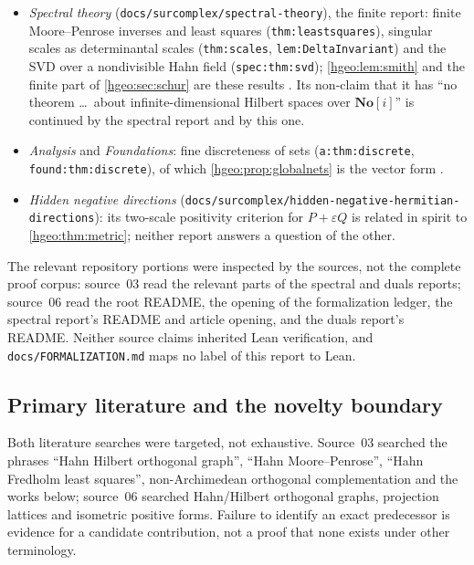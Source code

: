 \documentclass[11pt,letterpaper]{article}
\numberwithin{equation}{section}
\theoremstyle{definition}
\theoremstyle{remark}
\newcommand{\No}{\mathbf{No}}
\newcommand{\replabel}[1]{\nolinkurl{#1}}
\newcommand{\fn}[1]{\nolinkurl{#1}}
\begin{document}
\begin{itemize}[leftmargin=*]
orthogonal complement (\replabel{duals:thm:hyperplane}) and the exact
distance cut (\replabel{duals:thm:distance}), which
\cref{hgeo:prop:distancecut} repeats for an orthoclosed subspace. That report
also distinguishes algebraic scalar extension, valuation completion and
strong closure.
\item \emph{Spectral theory} (\fn{docs/surcomplex/spectral-theory}), the
finite report: finite Moore--Penrose inverses and least squares
(\replabel{thm:leastsquares}), singular scales as determinantal scales
(\replabel{thm:scales}, \replabel{lem:DeltaInvariant}) and the SVD over a
nondivisible Hahn field (\replabel{spec:thm:svd}); \cref{hgeo:lem:smith} and
the finite part of \cref{hgeo:sec:schur} are these results
\cite{RepoFinite}. Its non-claim that it has ``no theorem \ldots\ about
infinite-dimensional Hilbert spaces over $\No[i]$'' is continued by the
spectral report and by this one.
\item \emph{Analysis} and \emph{Foundations}: fine discreteness of sets
(\replabel{a:thm:discrete}, \replabel{found:thm:discrete}), of which
\cref{hgeo:prop:globalnets} is the vector form \cite{RepoAnalysis,RepoFound}.
\item \emph{Hidden negative directions}
(\fn{docs/surcomplex/hidden-negative-hermitian-directions}): its two-scale
positivity criterion for $P+\varepsilon Q$ is related in spirit to
\cref{hgeo:thm:metric}; neither report answers a question of the other.
\end{itemize}
The relevant repository portions were inspected by the sources, not the
complete proof corpus: source~03 read the relevant parts of the spectral and
duals reports; source~06 read the root README, the opening of the
formalization ledger, the spectral report's README and article opening, and
the duals report's README. Neither source claims inherited Lean
verification, and \fn{docs/FORMALIZATION.md} maps no label of this report to
Lean.

\subsection{Primary literature and the novelty boundary}
\label{hgeo:sub:literature}
Both literature searches were targeted, not exhaustive. Source~03 searched
the phrases ``Hahn Hilbert orthogonal graph'', ``Hahn Moore--Penrose'',
``Hahn Fredholm least squares'', non-Archimedean orthogonal complementation
and the works below; source~06 searched Hahn/Hilbert orthogonal graphs,
projection lattices and isometric positive forms. Failure to identify an
exact predecessor is evidence for a candidate contribution, not a proof that
none exists under other terminology.
\end{document}
